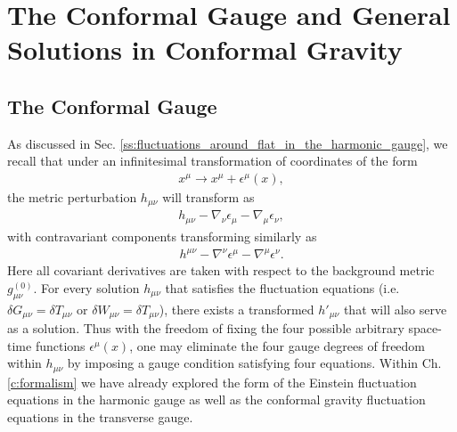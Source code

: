 \section{The Conformal Gauge and General Solutions in Conformal Gravity}
\label{s:conformal_gauge_sols}

\subsection{The Conformal Gauge}
\label{ss:conformal_gauge}
As discussed in Sec. \ref{ss:fluctuations_around_flat_in_the_harmonic_gauge}, we recall that under an infinitesimal transformation of coordinates of the form
%
\begin{eqnarray}
x^{\mu}\rightarrow x^{\mu}+\epsilon^{\mu}(x),
\label{liecoord}
\end{eqnarray}
%
the metric perturbation $h_{\mu\nu}$ will transform as
%
\begin{eqnarray}
h_{\mu\nu}-\nabla_{\nu}\epsilon_{\mu}-\nabla_{\mu}\epsilon_{\nu},
\label{covarh}
\end{eqnarray}
%
with contravariant components transforming similarly as
%
\begin{eqnarray}
h^{\mu\nu}-\nabla^{\nu}\epsilon^{\mu}-\nabla^{\mu}\epsilon^{\nu}.
\label{contrah}
\end{eqnarray}
%
Here all covariant derivatives are taken with respect to the background metric $g_{\mu\nu}^{(0)}$. For every solution $h_{\mu\nu}$ that satisfies the fluctuation equations (i.e. $\delta G_{\mu\nu} = \delta T_{\mu\nu}$ or $\delta W_{\mu\nu} = \delta T_{\mu\nu}$), there exists a transformed $h'_{\mu\nu}$ that will also serve as a solution. Thus with the freedom of fixing the four possible arbitrary space-time functions $\epsilon^\mu(x)$, one may eliminate the four gauge degrees of freedom within $h_{\mu\nu}$ by imposing a gauge condition satisfying four equations. Within Ch. \ref{c:formalism} we have already explored the form of the Einstein fluctuation equations in the harmonic gauge as well as the conformal gravity fluctuation equations in the transverse gauge.

